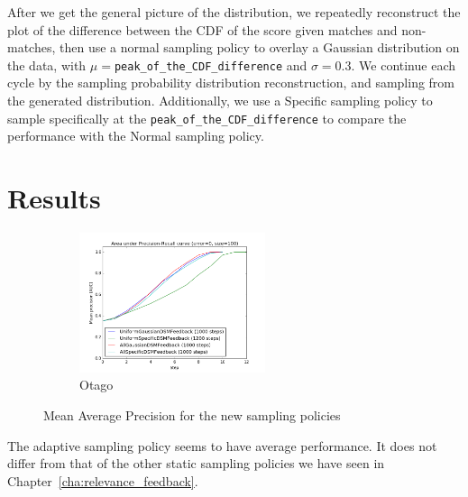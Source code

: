 After we get the general picture of the distribution, we repeatedly reconstruct
the plot of the difference between the CDF of the score given matches and
non-matches, then use a normal sampling policy to overlay a Gaussian
distribution on the data, with $\mu=$\texttt{peak\_of\_the\_CDF\_difference} and
$\sigma=0.3$. We continue each cycle by the sampling probability
distribution reconstruction, and sampling from the generated distribution.
Additionally, we use a Specific sampling policy to sample specifically at
the \texttt{peak\_of\_the\_CDF\_difference} to compare the performance with the
Normal sampling policy.

\section{Results}

\begin{figure}[htb]
  \centering
  \begin{subfigure}[t]{\textwidth}
    \centering
    \includegraphics[width=0.6\textwidth]{otago}
    \caption{Otago}
  \end{subfigure}
  \caption{Mean Average Precision for the new sampling policies}
  \label{fig:adaptive_aoc} %
\end{figure}

The adaptive sampling policy seems to have average performance. It
does not differ from that of the other static sampling policies we have seen in
Chapter~\ref{cha:relevance_feedback}.

